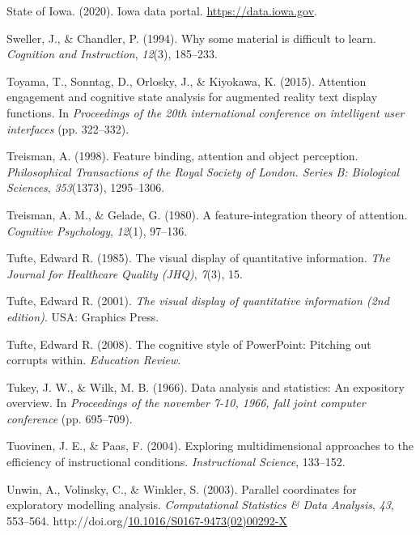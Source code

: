 \documentclass[print]{nuthesis}
\newlength{\cslhangindent}
\newenvironment{CSLReferences}[2]%
{\setlength{\parindent}{0pt}%
\everypar{\setlength{\hangindent}{\cslhangindent}}\ignorespaces}%
{\par}
\begin{document}
\begin{CSLReferences}{1}{0}
\leavevmode{}%
State of Iowa. (2020). Iowa data portal. \url{https://data.iowa.gov}.

\leavevmode{}%
Sweller, J., \& Chandler, P. (1994). Why some material is difficult to learn. \emph{Cognition and Instruction}, \emph{12}(3), 185--233.

\leavevmode{}%
Toyama, T., Sonntag, D., Orlosky, J., \& Kiyokawa, K. (2015). Attention engagement and cognitive state analysis for augmented reality text display functions. In \emph{Proceedings of the 20th international conference on intelligent user interfaces} (pp. 322--332).

\leavevmode{}%
Treisman, A. (1998). Feature binding, attention and object perception. \emph{Philosophical Transactions of the Royal Society of London. Series B: Biological Sciences}, \emph{353}(1373), 1295--1306.

\leavevmode{}%
Treisman, A. M., \& Gelade, G. (1980). A feature-integration theory of attention. \emph{Cognitive Psychology}, \emph{12}(1), 97--136.

\leavevmode{}%
Tufte, Edward R. (1985). The visual display of quantitative information. \emph{The Journal for Healthcare Quality (JHQ)}, \emph{7}(3), 15.

\leavevmode{}%
Tufte, Edward R. (2001). \emph{The visual display of quantitative information (2nd edition)}. USA: Graphics Press.

\leavevmode{}%
Tufte, Edward R. (2008). The cognitive style of PowerPoint: Pitching out corrupts within. \emph{Education Review}.

\leavevmode{}%
Tukey, J. W., \& Wilk, M. B. (1966). Data analysis and statistics: An expository overview. In \emph{Proceedings of the november 7-10, 1966, fall joint computer conference} (pp. 695--709).

\leavevmode{}%
Tuovinen, J. E., \& Paas, F. (2004). Exploring multidimensional approaches to the efficiency of instructional conditions. \emph{Instructional Science}, 133--152.

\leavevmode{}%
Unwin, A., Volinsky, C., \& Winkler, S. (2003). Parallel coordinates for exploratory modelling analysis. \emph{Computational Statistics \& Data Analysis}, \emph{43}, 553--564. http://doi.org/\href{https://doi.org/10.1016/S0167-9473(02)00292-X}{10.1016/S0167-9473(02)00292-X}


\end{CSLReferences}
\end{document}
